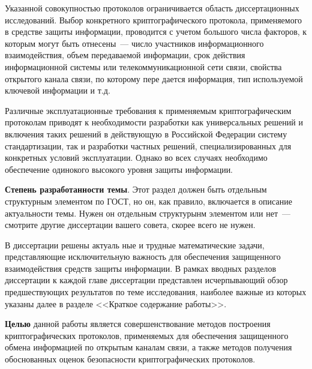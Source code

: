 \documentclass[14pt]{cmcmsuthesis-bachelor}
\begin{document}
Указанной совокупностью протоколов ограничивается область диссертационных исследований.
Выбор конкретного криптографического протокола, применяемого в средстве защиты информации, проводится с учетом большого числа факторов, к которым могут быть отнесены~--- число участников информационного взаимодействия, объем передаваемой информации, срок действия информационной системы или телекоммуникационной сети связи, свойства открытого канала связи, по которому пере дается информация, тип используемой ключевой информации и т.д.

Различные эксплуатационные требования к применяемым криптографическим протоколам приводят к необходимости разработки как универсальных решений и включения таких решений в действующую в Российской Федерации систему стандартизации, так и разработки частных решений, специализированных для конкретных условий эксплуатации.
Однако во всех случаях необходимо обеспечение одинокого высокого уровня защиты информации.

\textbf{Степень разработанности темы}.
Этот раздел должен быть отдельным структурным элементом по ГОСТ, но он, как правило, включается в описание актуальности темы.
Нужен он отдельным структурынм элементом или нет~--- смотрите другие диссертации вашего совета, скорее всего не нужен.

В диссертации решены актуаль ные и трудные математические задачи, представляющие исключительную важность для обеспечения защищенного взаимодействия средств защиты информации.
В рамках вводных разделов диссертации к каждой главе диссертации представлен исчерпывающий обзор предшествующих результатов по теме исследования, наиболее важные из которых указаны далее в разделе {}<<Краткое содержание работы>>{}.

\textbf{Целью} данной работы является совершенствование методов построения криптографических протоколов, применяемых для обеспечения защищенного обмена информацией по открытым каналам связи, а также методов получения обоснованных оценок безопасности криптографических протоколов.
\end{document}
